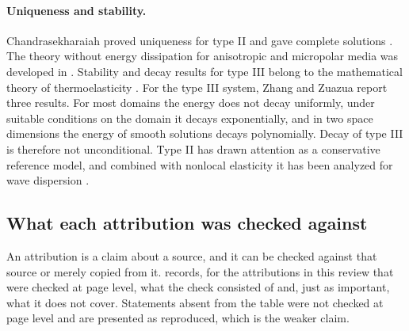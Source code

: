 \paragraph{Uniqueness and stability.} Chandrasekharaiah proved uniqueness for type II \citep{Chandrasekharaiah1996} and gave complete solutions \citep{Chandrasekharaiah1997}. The theory without energy dissipation for anisotropic and micropolar media was developed in \citep{Iesan1998,Quintanilla1999,Ciarletta1999,Quintanilla2002}. Stability and decay results for type III belong to the mathematical theory of thermoelasticity \citep{Suh1998}. For the type III system, Zhang and Zuazua \citep{ZhangZuazua2003} report three results. For most domains the energy does not decay uniformly, under suitable conditions on the domain it decays exponentially, and in two space dimensions the energy of smooth solutions decays polynomially. Decay of type III is therefore not unconditional. Type II has drawn attention as a conservative reference model, and combined with nonlocal elasticity it has been analyzed for wave dispersion \citep{Sarkar2019}.

\subsection{What each attribution was checked against}\label{sec:provenance}

An attribution is a claim about a source, and it can be checked against that source or merely copied from it.  records, for the attributions in this review that were checked at page level, what the check consisted of and, just as important, what it does not cover. Statements absent from the table were not checked at page level and are presented as reproduced, which is the weaker claim.

